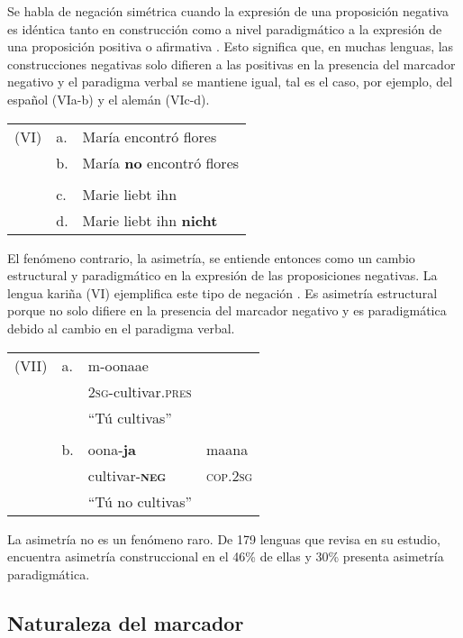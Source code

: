 \noindent Se habla de negación simétrica cuando la expresión de una proposición negativa es idéntica tanto en construcción como a nivel paradigmático a la expresión de una proposición positiva o afirmativa \textcolor{MidnightBlue}{\citep{Miestamo2005}}. Esto significa que, en muchas lenguas, las construcciones negativas solo difieren a las positivas en la presencia del marcador negativo y el paradigma verbal se mantiene igual, tal es el caso, por ejemplo, del español (VIa-b) y el alemán (VIc-d). \vspace{0.5cm}

{\setmainfont{Charis SIL}
\begin{tabular}{lll}
(VI) & a. & María encontró flores \\
& b. & María \textbf{no} encontró flores \\
& & \\
& c. & Marie liebt ihn \\
& d. & Marie liebt ihn \textbf{nicht} \\
\end{tabular} \vspace{0.5cm}}

El fenómeno contrario, la asimetría, se entiende entonces como un cambio estructural y paradigmático en la expresión de las proposiciones negativas. La lengua kariña (VI) ejemplifica este tipo de negación \textcolor{MidnightBlue}{\citep{Mosonyi2000}}. Es asimetría estructural porque no solo difiere en la presencia del marcador negativo y es paradigmática debido al cambio en el paradigma verbal. \vspace{0.5cm}

{\setmainfont{Charis SIL} 
\begin{tabular}{llll}
(VII) & a. & m-oonaae \\
& & \textsc{2sg}-cultivar.\textsc{pres} \\
& & ``Tú cultivas'' \\
& & & \\
& b. & oona-\textbf{ja} & maana \\
& & cultivar-\textsc{\textbf{neg}} & \textsc{cop.2sg} \\
& & ``Tú no cultivas'' \\
\end{tabular} \vspace{0.5cm}}

La asimetría no es un fenómeno raro. De 179 lenguas que \textcolor{MidnightBlue}{\citet{Miestamo2005}} revisa en su estudio, encuentra asimetría construccional en el 46\% de ellas y 30\% presenta asimetría paradigmática.

\subsection*{Naturaleza del marcador}
